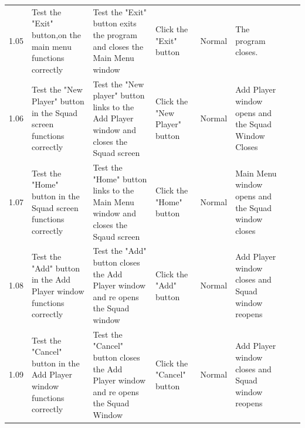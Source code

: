 \begin{table}[]
\begin{tabular}{llllllll}
		1.05                   & Test the "Exit" button,on the main menu functions correctly                      & Test the "Exit" button exits the program and closes the Main Menu window                                                  & Click the "Exit" button                                               & Normal                                                                  & The program closes.                                                                           &               &                      \\
		1.06                   & Test the "New Player" button in the Squad screen functions correctly             & Test the "New player" button links to the Add Player window and closes the Squad screen                                   & Click the "New Player" button                                         & Normal                                                                  & Add Player window opens and the Squad Window Closes                                           &               &                      \\
		1.07                   & Test the "Home" button in the Squad screen functions correctly                   & Test the "Home" button links to the Main Menu window and closes the Sqaud screen                                          & Click the "Home" button                                               & Normal                                                                  & Main Menu window opens and the Squad window closes                                            &               &                      \\
		1.08                   & Test the "Add" button in the Add Player window functions correctly               & Test the "Add" button closes the Add Player window and re opens the Squad window                                          & Click the "Add" button                                                & Normal                                                                  & Add Player window closes and Squad window reopens                                             &               &                      \\
		1.09                   & Test the "Cancel" button in the Add Player window functions correctly            & Test the "Cancel" button closes the Add Player window and re opens the Squad Window                                       & Click the "Cancel" button                                             & Normal                                                                  & Add Player window closes and Squad window reopens                                             &               &                      \\

\end{tabular}
\end{table}
